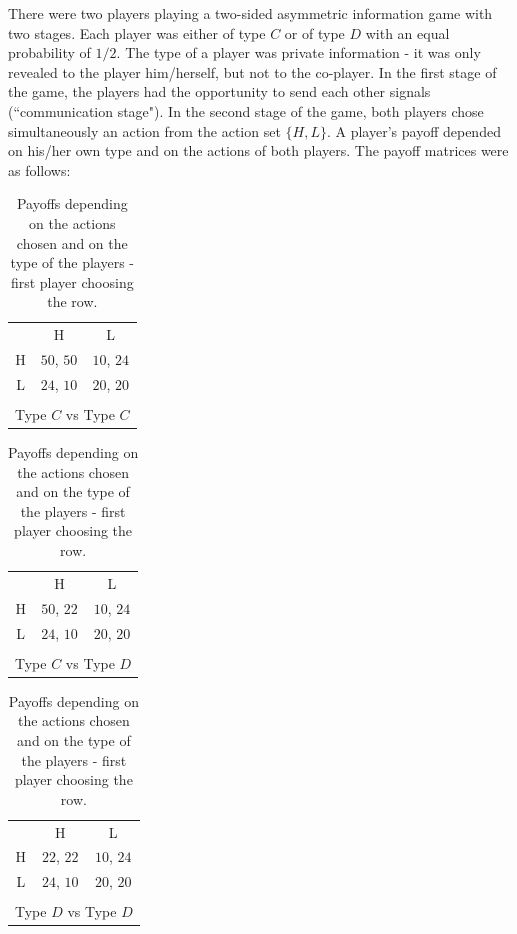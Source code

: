 \documentclass[12pt]{article}
\theoremstyle{break}
\begin{document}
There were two players playing a two-sided asymmetric information game with two stages. Each player was either of type $C$ or of type $D$ with an equal probability of $1/2$. The type of a player was private information - it was only revealed to the player him/herself, but not to the co-player. In the first stage of the game, the players had the opportunity to send each other signals (``communication stage"). In the second stage of the game, both players chose simultaneously an action from the action set $\{H,L\}$. A player's payoff depended on his/her own type and on the actions of both players. The payoff matrices were as follows:
	\begin{table}[!htbp]
    	\centering
		\begin{tabular}{c c c}
			  & H   & L   \\ \cline{2-3}
			H & \multicolumn{1}{|c|}{$50$, $50$} & \multicolumn{1}{c|}{$10$, $24$} \\ \cline{2-3}
			L & \multicolumn{1}{|c|}{$24$, $10$} & \multicolumn{1}{c|}{$20$, $20$} \\ \cline{2-3}
            \\
            \multicolumn{3}{c}{Type $C$ vs Type $C$} \\
		\end{tabular}
		\hfill
   		\begin{tabular}{c c c}
			  & H   & L   \\ \cline{2-3}
			H & \multicolumn{1}{|c|}{$50$, $22$} & \multicolumn{1}{c|}{$10$, $24$} \\ \cline{2-3}
			L & \multicolumn{1}{|c|}{$24$, $10$} & \multicolumn{1}{c|}{$20$, $20$} \\ \cline{2-3}
			\\
            \multicolumn{3}{c}{Type $C$  vs Type $D$} \\
		\end{tabular}
        \hfill
   		\begin{tabular}{c c c}
			  & H   & L   \\ \cline{2-3}
			H & \multicolumn{1}{|c|}{$22$, $22$} & \multicolumn{1}{c|}{$10$, $24$} \\ \cline{2-3}
			L & \multicolumn{1}{|c|}{$24$, $10$} & \multicolumn{1}{c|}{$20$, $20$} \\ \cline{2-3}
			\\
            \multicolumn{3}{c}{Type $D$ vs Type $D$} \\
		\end{tabular}
        \caption{Payoffs depending on the actions chosen and on the type of the players - first player choosing the row.}\label{game_table}
	\end{table}
\end{document}
